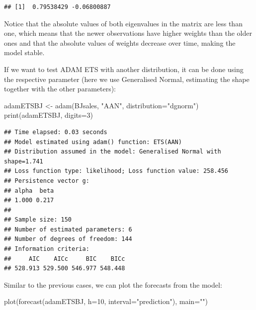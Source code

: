 \documentclass[
]{book}
\newenvironment{Shaded}{\begin{snugshade}}{\end{snugshade}}
\newcommand{\AttributeTok}[1]{\textcolor[rgb]{0.77,0.63,0.00}{#1}}
\newcommand{\DecValTok}[1]{\textcolor[rgb]{0.00,0.00,0.81}{#1}}
\newcommand{\FunctionTok}[1]{\textcolor[rgb]{0.00,0.00,0.00}{#1}}
\newcommand{\NormalTok}[1]{#1}
\newcommand{\OtherTok}[1]{\textcolor[rgb]{0.56,0.35,0.01}{#1}}
\newcommand{\StringTok}[1]{\textcolor[rgb]{0.31,0.60,0.02}{#1}}
\theoremstyle{definition}
\theoremstyle{definition}
\theoremstyle{definition}
\theoremstyle{definition}
\theoremstyle{remark}
\begin{document}
\begin{verbatim}
## [1]  0.79538429 -0.06800887
\end{verbatim}

Notice that the absolute values of both eigenvalues in the matrix are less than one, which means that the newer observations have higher weights than the older ones and that the absolute values of weights decrease over time, making the model stable.

If we want to test ADAM ETS with another distribution, it can be done using the respective parameter (here we use Generalised Normal, estimating the shape together with the other parameters):

\begin{Shaded}
\begin{Highlighting}[]
\NormalTok{adamETSBJ }\OtherTok{\textless{}{-}} \FunctionTok{adam}\NormalTok{(BJsales, }\StringTok{"AAN"}\NormalTok{, }\AttributeTok{distribution=}\StringTok{"dgnorm"}\NormalTok{)}
\FunctionTok{print}\NormalTok{(adamETSBJ, }\AttributeTok{digits=}\DecValTok{3}\NormalTok{)}
\end{Highlighting}
\end{Shaded}

\begin{verbatim}
## Time elapsed: 0.03 seconds
## Model estimated using adam() function: ETS(AAN)
## Distribution assumed in the model: Generalised Normal with shape=1.741
## Loss function type: likelihood; Loss function value: 258.456
## Persistence vector g:
## alpha  beta 
## 1.000 0.217 
## 
## Sample size: 150
## Number of estimated parameters: 6
## Number of degrees of freedom: 144
## Information criteria:
##     AIC    AICc     BIC    BICc 
## 528.913 529.500 546.977 548.448
\end{verbatim}

Similar to the previous cases, we can plot the forecasts from the model:

\begin{Shaded}
\begin{Highlighting}[]
\FunctionTok{plot}\NormalTok{(}\FunctionTok{forecast}\NormalTok{(adamETSBJ, }\AttributeTok{h=}\DecValTok{10}\NormalTok{, }\AttributeTok{interval=}\StringTok{"prediction"}\NormalTok{),}
     \AttributeTok{main=}\StringTok{""}\NormalTok{)}
\end{Highlighting}
\end{Shaded}
\end{document}
